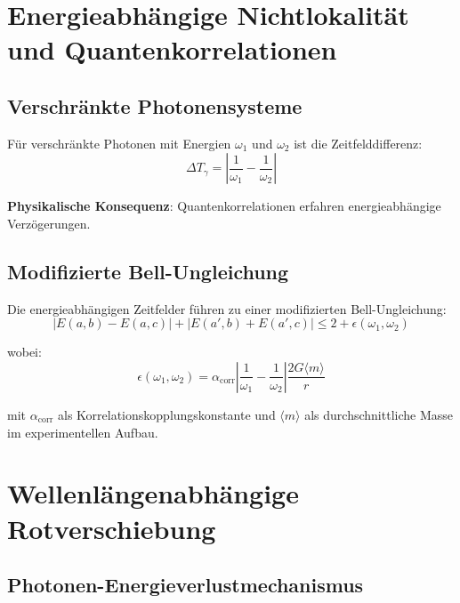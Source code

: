 \documentclass[12pt,a4paper]{article}
\begin{document}
	\section{Energieabhängige Nichtlokalität und Quantenkorrelationen}
	
	\subsection{Verschränkte Photonensysteme}
	
	Für verschränkte Photonen mit Energien $\omega_1$ und $\omega_2$ ist die Zeitfelddifferenz:
	\begin{equation}
		\Delta T_\gamma = \left|\frac{1}{\omega_1} - \frac{1}{\omega_2}\right|
		\label{eq:time_field_difference}
	\end{equation}
	
	\textbf{Physikalische Konsequenz}: Quantenkorrelationen erfahren energieabhängige Verzögerungen.
	
	\subsection{Modifizierte Bell-Ungleichung}
	
	Die energieabhängigen Zeitfelder führen zu einer modifizierten Bell-Ungleichung:
	\begin{equation}
		|E(a,b) - E(a,c)| + |E(a',b) + E(a',c)| \leq 2 + \epsilon(\omega_1, \omega_2)
		\label{eq:modified_bell_inequality}
	\end{equation}
	
	wobei:
	\begin{equation}
		\epsilon(\omega_1, \omega_2) = \alpha_{\text{corr}} \left|\frac{1}{\omega_1} - \frac{1}{\omega_2}\right| \frac{2G\langle m \rangle}{r}
		\label{eq:bell_correction}
	\end{equation}
	
	mit $\alpha_{\text{corr}}$ als Korrelationskopplungskonstante und $\langle m \rangle$ als durchschnittliche Masse im experimentellen Aufbau.
	
	\section{Wellenlängenabhängige Rotverschiebung}
	
	\subsection{Photonen-Energieverlustmechanismus}
	
\end{document}

